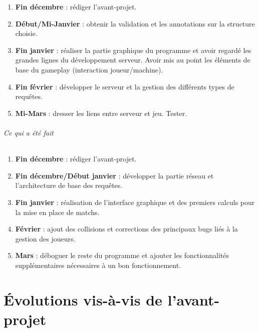 \documentclass[a4paper,12pt]{report}
\begin{document}
\begin{enumerate}

\item \textbf{Fin décembre} : rédiger l'avant-projet.

\item \textbf{Début/Mi-Janvier} : obtenir la validation et les annotations sur la structure choisie.

\item \textbf{Fin janvier} : réaliser la partie graphique du programme et avoir regardé les grandes lignes du développement serveur. Avoir mis au point les éléments de base du gameplay (interaction joueur/machine).

\item \textbf{Fin février} : développer le serveur et la gestion des différents types de requêtes.

\item \textbf{Mi-Mars} : dresser les liens entre serveur et jeu. Tester.

\end{enumerate}

\paragraph{Ce qui a été fait}

\begin{enumerate}

\item \textbf{Fin décembre} : rédiger l'avant-projet.

\item \textbf{Fin décembre/Début janvier} : développer la partie réseau et l'architecture de base des requêtes.

\item \textbf{Fin janvier} : réalisation de l'interface graphique et des premiers calculs pour la mise en place de matchs.

\item \textbf{Février} : ajout des collisions et corrections des principaux bugs liés à la gestion des joueurs.

\item \textbf{Mars} : déboguer le reste du programme et ajouter les fonctionnalités supplémentaires nécessaires à un bon fonctionnement.

\end{enumerate}

\part{Évolutions vis-à-vis de l'avant-projet}
\end{document}
